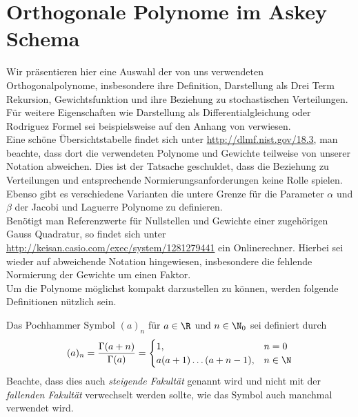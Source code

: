 
\chapter{Orthogonale Polynome im Askey Schema} %

\label{AppendixA} %

Wir präsentieren hier eine Auswahl der von uns verwendeten Orthogonalpolynome, insbesondere ihre Definition, Darstellung als Drei Term Rekursion, Gewichtsfunktion und ihre Beziehung zu stochastischen Verteilungen. Für weitere Eigenschaften wie Darstellung als Differentialgleichung oder Rodriguez Formel sei beispielsweise auf den Anhang von \autocite{dongbinxiu2010} verwiesen.\\
Eine schöne Übersichtstabelle findet sich unter \url{http://dlmf.nist.gov/18.3}, man beachte, dass dort die verwendeten Polynome und Gewichte teilweise von unserer Notation abweichen. Dies ist der Tatsache geschuldet, dass die Beziehung zu Verteilungen und entsprechende Normierungsanforderungen keine Rolle spielen. Ebenso gibt es verschiedene Varianten die untere Grenze für die Parameter $\alpha$ und $\beta$ der Jacobi und Laguerre Polynome zu definieren.\\
Benötigt man Referenzwerte für Nullstellen und Gewichte einer zugehörigen Gauss Quadratur, so findet sich unter\\\url{http://keisan.casio.com/exec/system/1281279441} ein Onlinerechner. Hierbei sei wieder auf abweichende Notation hingewiesen, insbesondere die fehlende Normierung der Gewichte um einen Faktor.\\
Um die Polynome möglichst kompakt darzustellen zu können, werden folgende Definitionen nützlich sein.
\begin{mathdef}
Das Pochhammer Symbol $(a)_n$ für $a\in\R$ und $n\in\N_0$ sei definiert durch
\[(a)_n=\frac{\Gamma(a+n)}{\Gamma(a)}=
   \begin{cases}
   1, &n=0\\
   a(a+1)\dots (a+n-1), &n\in\N
   \end{cases}
   \]
Beachte, dass dies auch \emph{steigende Fakultät} genannt wird und nicht mit der \emph{fallenden Fakultät} verwechselt werden sollte, wie das Symbol auch manchmal verwendet wird.
\end{mathdef}

